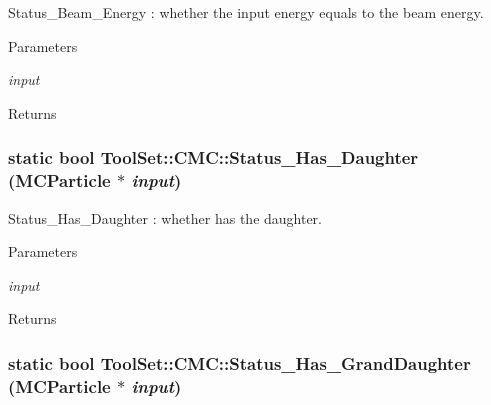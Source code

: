 Status\_\-Beam\_\-Energy : whether the input energy equals to the beam energy. 
\begin{DoxyParams}{Parameters}
\item[{\em input}]\end{DoxyParams}
\begin{DoxyReturn}{Returns}

\end{DoxyReturn}
\hypertarget{classToolSet_1_1CMC_a1771a4a8936446f9dfe5f9d22b5d9322}{
\subsubsection[{Status\_\-Has\_\-Daughter}]{\setlength{\rightskip}{0pt plus 5cm}static bool ToolSet::CMC::Status\_\-Has\_\-Daughter (MCParticle $\ast$ {\em input})}}
\label{classToolSet_1_1CMC_a1771a4a8936446f9dfe5f9d22b5d9322}


Status\_\-Has\_\-Daughter : whether has the daughter. 
\begin{DoxyParams}{Parameters}
\item[{\em input}]\end{DoxyParams}
\begin{DoxyReturn}{Returns}

\end{DoxyReturn}
\hypertarget{classToolSet_1_1CMC_a79d54fb4529c17a59ab21a51b3f6889c}{
\subsubsection[{Status\_\-Has\_\-GrandDaughter}]{\setlength{\rightskip}{0pt plus 5cm}static bool ToolSet::CMC::Status\_\-Has\_\-GrandDaughter (MCParticle $\ast$ {\em input})}}
\label{classToolSet_1_1CMC_a79d54fb4529c17a59ab21a51b3f6889c}


